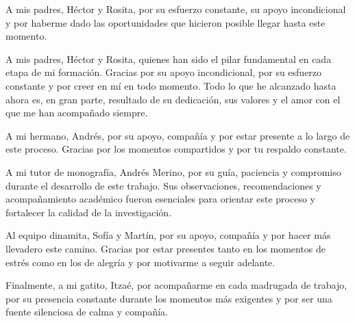 \documentclass[11pt,oneside]{book}
\begin{document}
\frontmatter
\portadilla
\certificacion

\begin{dedicatoria}
    A mis padres, Héctor y Rosita, por su esfuerzo constante, su apoyo incondicional y por haberme dado las oportunidades que hicieron posible llegar hasta este momento.
\end{dedicatoria} 

\begin{agradecimiento}
    A mis padres, Héctor y Rosita, quienes han sido el pilar fundamental en cada etapa de mi formación. Gracias por su apoyo incondicional, por su esfuerzo constante y por creer en mí en todo momento. Todo lo que he alcanzado hasta ahora es, en gran parte, resultado de su dedicación, sus valores y el amor con el que me han acompañado siempre.

    A mi hermano, Andrés, por su apoyo, compañía y por estar presente a lo largo de este proceso. Gracias por los momentos compartidos y por tu respaldo constante.
    
    A mi tutor de monografía, Andrés Merino, por su guía, paciencia y compromiso durante el desarrollo de este trabajo. Sus observaciones, recomendaciones y acompañamiento académico fueron esenciales para orientar este proceso y fortalecer la calidad de la investigación.

    Al equipo dinamita, Sofía y Martín, por su apoyo, compañía y por hacer más llevadero este camino. Gracias por estar presentes tanto en los momentos de estrés como en los de alegría y por motivarme a seguir adelante.

    Finalmente, a mi gatito, Itzaé, por acompañarme en cada madrugada de trabajo, por su presencia constante durante los momentos más exigentes y por ser una fuente silenciosa de calma y compañía. 
\end{agradecimiento}

\tableofcontents

\begingroup
\singlespacing
\setlength{\parskip}{8 pt}
\listoftables
\endgroup

\begingroup
\singlespacing
\setlength{\parskip}{8 pt}
\listoffigures
\endgroup

\mainmatter
\addtolength{\abovedisplayskip}{-2.2mm}
\addtolength{\belowdisplayskip}{-2.2mm}












\nocite{*}
\printbibliography
\end{document}
